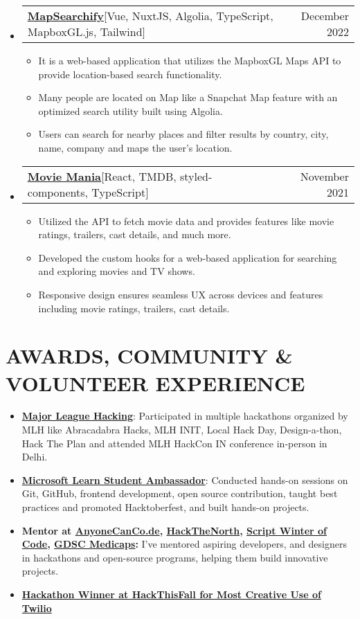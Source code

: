 \documentclass[letterpaper,11pt]{article}
\makeatletter
\newcommand{\resumeItem}[1]{
    \item\small{
      {#1 \vspace{-2pt}}
    }
  }
\newcommand{\resumeProjectHeading}[2]{
      \item
      \begin{tabular*}{0.97\textwidth}{l@{\extracolsep{\fill}}r}
        \small#1 & #2 \\
      \end{tabular*}\vspace{-7pt}
  }
\newcommand{\resumeSubHeadingListStart}{\begin{itemize}[leftmargin=0.15in, label={}]}
\newcommand{\resumeSubHeadingListEnd}{\end{itemize}}
\newcommand{\resumeItemListStart}{\begin{itemize}}
\newcommand{\resumeItemListEnd}{\end{itemize}\vspace{-5pt}}
\makeatother
\begin{document}
\resumeSubHeadingListStart
\resumeProjectHeading
{\textbf{\href{https://github.com/ayushsoni1010/mapsearchify}{MapSearchify}\hspace{3pt}}{{[Vue, NuxtJS, Algolia, TypeScript, MapboxGL.js, Tailwind]}}}{December 2022}
\resumeItemListStart
\resumeItem{It is a web-based application that utilizes the MapboxGL Maps API to provide location-based search functionality.}
\resumeItem{Many people are located on Map like a Snapchat Map feature with an optimized search utility built using Algolia.}
\resumeItem{Users can search for nearby places and filter results by country, city, name, company and maps the user's location.}
\resumeItemListEnd
\resumeSubHeadingListEnd

\resumeSubHeadingListStart
\resumeProjectHeading
{\textbf{\href{https://github.com/ayushsoni1010/moviemania}{Movie Mania}\hspace{3pt}}{{[React, TMDB, styled-components, TypeScript]}}}{November 2021}
\resumeItemListStart
\resumeItem{Utilized the API to fetch movie data and provides features like movie ratings, trailers, cast details, and much more.}
\resumeItem{Developed the custom hooks for a web-based application for searching and exploring movies and TV shows.}
\resumeItem{Responsive design ensures seamless UX across devices and features including movie ratings, trailers, cast details.}
\resumeItemListEnd
\resumeSubHeadingListEnd


\section{AWARDS, COMMUNITY \& VOLUNTEER EXPERIENCE}
 \begin{itemize}[leftmargin=0.15in, label={}]
    \small{\item{
        \resumeItemListStart
                \resumeItem{\textbf{\href{https://mlh.io}{Major League Hacking}}{: Participated in multiple hackathons organized by MLH like Abracadabra Hacks, MLH INIT, Local Hack Day, Design-a-thon, Hack The Plan and attended MLH HackCon IN conference in-person in Delhi.}} \vspace{2pt}
                \resumeItem{\textbf{\href{https://studentambassadors.microsoft.com/}{Microsoft Learn Student Ambassador}}{: Conducted hands-on sessions on Git, GitHub, frontend development, open source contribution, taught best practices and promoted Hacktoberfest, and built hands-on projects.}} \vspace{2pt}
                \resumeItem{\textbf{Mentor at {\href{https://hackacode.anyonecanco.de}{AnyoneCanCo.de}}, {\href{https://hackthenorth.com}{HackTheNorth}}, {\href{https://swoc.scriptindia.org}{Script Winter of Code}}, {\href{https://gdsc.community.dev/medi-caps-university-indore}{GDSC Medicaps}}:}
 {I've mentored aspiring developers, and designers in hackathons and open-source programs, helping them build innovative projects.}} \vspace{2pt}
                \resumeItem{\textbf{\href{https://devpost.com/software/budgetstay}{Hackathon Winner at HackThisFall for Most Creative Use of Twilio}}} \vspace{2pt}
      \resumeItemListEnd
    }}
 \end{itemize}
\end{document}
